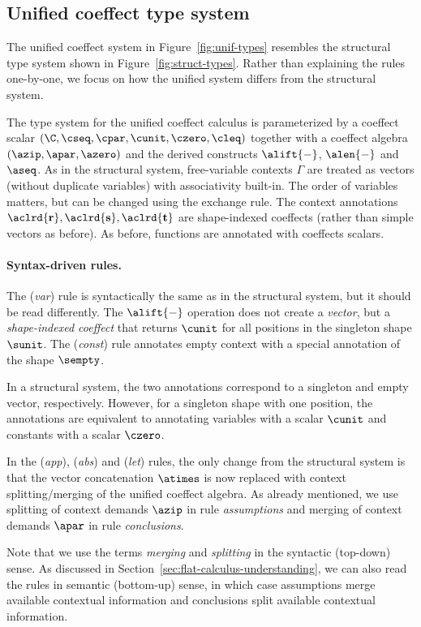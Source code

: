 \subsection{Unified coeffect type system}
\label{sec:further-types}
The unified coeffect system in Figure~\ref{fig:unif-types} resembles the structural type system
shown in Figure~\ref{fig:struct-types}. Rather than explaining the rules one-by-one, we focus on
how the unified system differs from the structural system.

The type system for the unified coeffect calculus is parameterized by a coeffect scalar
$(\C, \cseq, \cpar, \cunit, \czero, \cleq)$ together with a coeffect algebra $(\azip, \apar, \azero)$
and the derived constructs $\alift{-}$, $\alen{-}$ and $\aseq$.
As in the structural system, free-variable contexts $\Gamma$ are treated as vectors (without duplicate
variables) with associativity built-in. The order of variables matters, but can be changed
using the exchange rule. The context annotations $\aclrd{\textbf{r}}, \aclrd{\textbf{s}}, \aclrd{\textbf{t}}$
are shape-indexed coeffects (rather than simple vectors as before). As before, functions are
annotated with coeffects scalars.

\paragraph{Syntax-driven rules.}
The (\emph{var}) rule is syntactically the same as in the structural system, but it should be read
differently. The $\alift{-}$ operation does not create a \emph{vector}, but a \emph{shape-indexed
coeffect} that returns $\cunit$ for all positions in the singleton shape $\sunit$.
The (\emph{const}) rule annotates empty context with a special annotation of the shape $\sempty$.

In a structural system, the two annotations correspond to a singleton and empty vector, respectively.
However, for a singleton shape with one position, the annotations are equivalent to annotating
variables with a scalar $\cunit$ and constants with a scalar $\czero$.

In the (\emph{app}), (\emph{abs}) and (\emph{let}) rules, the only change from the structural
system is that the vector concatenation $\atimes$ is now replaced with context splitting/merging
of the unified coeffect algebra. As already mentioned, we use splitting of context demands $\azip$
in rule \emph{assumptions} and merging of context demands $\apar$ in rule \emph{conclusions}.

Note that we use the terms \emph{merging} and \emph{splitting} in the syntactic (top-down) sense. As
discussed in Section~\ref{sec:flat-calculus-understanding}, we can also read
the rules in semantic (bottom-up) sense, in which case assumptions merge available contextual
information and conclusions split available contextual information.

